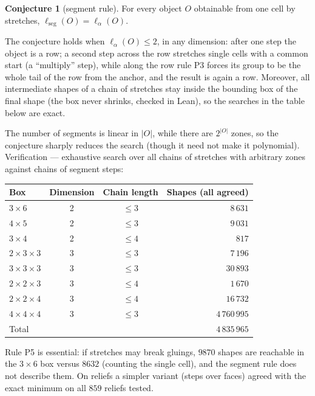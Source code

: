 \documentclass[11pt,a4paper]{article}
\theoremstyle{plain}
\theoremstyle{definition}
\newtheorem{conjecture}{Conjecture}
\theoremstyle{remark}
\begin{document}
\begin{conjecture}[segment rule]\label{conj:seg}
For every object $O$ obtainable from one cell by stretches, $\ell_{\mathrm{seg}}(O)=\ell_\alpha(O)$.
\end{conjecture}

The conjecture holds when $\ell_\alpha(O)\le2$, in any dimension: after one step the object is a row; a second step across the row stretches single cells with a common start (a ``multiply'' step), while along the row rule P3 forces its group to be the whole tail of the row from the anchor, and the result is again a row. Moreover, all intermediate shapes of a chain of stretches stay inside the bounding box of the final shape (the box never shrinks, checked in Lean), so the searches in the table below are exact.

The number of segments is linear in $|O|$, while there are $2^{|O|}$ zones, so the conjecture sharply reduces the search (though it need not make it polynomial). Verification — exhaustive search over all chains of stretches with arbitrary zones against chains of segment steps:

\begin{center}
\begin{tabular}{lccr}
\toprule
Box & Dimension & Chain length & Shapes (all agreed)\\
\midrule
$3\times6$ & 2 & $\le3$ & $8\,631$\\
$4\times5$ & 2 & $\le3$ & $9\,031$\\
$3\times4$ & 2 & $\le4$ & $817$\\
$2\times3\times3$ & 3 & $\le3$ & $7\,196$\\
$3\times3\times3$ & 3 & $\le3$ & $30\,893$\\
$2\times2\times3$ & 3 & $\le4$ & $1\,670$\\
$2\times2\times4$ & 3 & $\le4$ & $16\,732$\\
$4\times4\times4$ & 3 & $\le3$ & $4\,760\,995$\\
\midrule
Total & & & $4\,835\,965$\\
\bottomrule
\end{tabular}
\end{center}

Rule P5 is essential: if stretches may break gluings, $9870$ shapes are reachable in the $3\times6$ box versus $8632$ (counting the single cell), and the segment rule does not describe them. On reliefs a simpler variant (steps over faces) agreed with the exact minimum on all $859$ reliefs tested.
\end{document}

